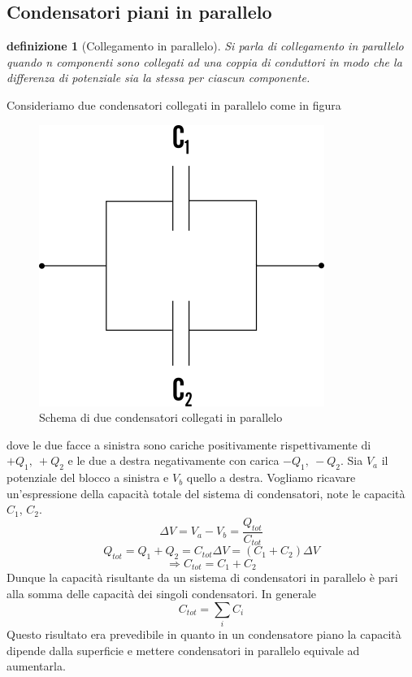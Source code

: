 \documentclass[10pt,a4paper]{article}
\newtheorem{definizione}{definizione}
\begin{document}
\subsection*{Condensatori piani in parallelo}
\begin{definizione}[Collegamento in parallelo]
Si parla di collegamento in parallelo quando n componenti sono collegati ad una coppia di conduttori in modo che la differenza di potenziale sia la stessa per ciascun componente.
\end{definizione}
Consideriamo due condensatori collegati in parallelo come in figura
\begin{figure}[h!]
	\centering
	\includegraphics[width=0.4\linewidth]{images/Condensatori_parallelo}
	\caption{Schema di due condensatori collegati in parallelo}
	\label{fig:condensatoriparallelo}
\end{figure}
\FloatBarrier
dove le due facce a sinistra sono cariche positivamente rispettivamente di \(+Q_1,\ +Q_2\) e le due a destra negativamente con carica \(-Q_1,\ -Q_2\). Sia \(V_a\) il potenziale del blocco a sinistra e \(V_b\) quello a destra. Vogliamo ricavare un'espressione della capacità totale del sistema di condensatori, note le capacità \(C_1\), \(C_2\). 
\[\Delta V = V_a - V_b = \frac{Q_{tot}}{C_{tot}}\] 
\[Q_{tot}=Q_1+Q_2=C_{tot}\Delta V = (C_1+C_2)\Delta V\]
\[\Rightarrow C_{tot} = C_1 +C_2\]
Dunque la capacità risultante da un sistema di condensatori in parallelo è pari alla somma delle capacità dei singoli condensatori. In generale
\[C_{tot} = \sum_i C_i\]
Questo risultato era prevedibile in quanto in un condensatore piano la capacità dipende dalla superficie e mettere condensatori in parallelo equivale ad aumentarla. 
\end{document}

